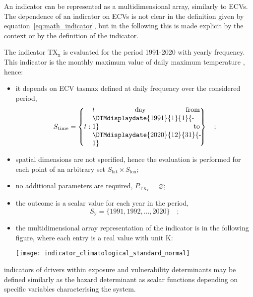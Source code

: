 An \gls{indicator} can be represented as a multidimensional array, similarly to \glspl{ECV}.
The dependence of an \gls{indicator} on \glspl{ECV} is not clear in the definition given by equation~\eqref{eq:math_indicator}, but in the following this is made explicit by the context or by the definition of the \gls{indicator}.

\begin{example}
  The \gls{indicator} $\mathrm{TX_x}$ is evaluated for the period 1991-2020 with yearly frequency. This \gls{indicator} is the monthly maximum value of daily maximum temperature \cite{ETCCDIClimate}, hence:
  \begin{itemize}
    \item it depends on \gls{ECV} \glsdesc{tasmax} defined at daily frequency over the considered period,
      \begin{equation*}
        S_\text{time} = \left\{ t : \parbox{0.45\linewidth}{$t$ day from \DTMdisplaydate{1991}{1}{1}{-1} to \DTMdisplaydate{2020}{12}{31}{-1}} \right\}
        \quad ;
      \end{equation*}
    \item spatial dimensions are not specified, hence the evaluation is performed for each point of an arbitrary set $S_\text{lat} \times S_\text{lon}$;
    \item no additional parameters are required, $P_\mathrm{TX_x} = \varnothing$;
    \item the outcome is a scalar value for each year in the period,
      \begin{equation*}
        S_\text{y} = \{ 1991, 1992, \dots, 2020 \}
        \quad ;
      \end{equation*}
    \item the multidimensional array representation of the \gls{indicator} is in the following figure, where each entry is a real value with unit \unit{\kelvin}:
      \begin{center}
        \texttt{[image: indicator\_climatological\_standard\_normal]}
      \end{center}
  \end{itemize}
\end{example}

\Glspl{indicator} of \glspl{driver} within \gls{exposure} and \gls{vulnerability} \glspl{determinant} may be defined similarly as the \gls{hazard} \gls{determinant} as scalar functions depending on specific variables characterising the system.
